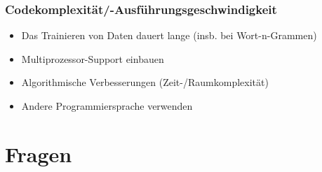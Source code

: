 \documentclass[t]{beamer} %
\begin{document}
\begin{frame}
  \frametitle{Codekomplexität/-Ausführungsgeschwindigkeit}
  \begin{itemize}
  \item Das Trainieren von Daten dauert lange (insb. bei Wort-n-Grammen)\pause
  \vspace*{1ex}
  \item Multiprozessor-Support einbauen\pause
  \item Algorithmische Verbesserungen (Zeit-/Raumkomplexität)\pause
  \item Andere Programmiersprache verwenden\pause
  \vspace*{1ex}
  \end{itemize}  
\end{frame}

\section{Fragen}
\end{document}
